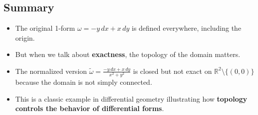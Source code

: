 \documentclass{article}
\begin{document}
	\subsection*{Summary}
	
	\begin{itemize}
		\item The original 1-form \( \omega = -y\,dx + x\,dy \) is defined everywhere, including the origin.
		\item But when we talk about \textbf{exactness}, the topology of the domain matters.
		\item The normalized version \( \tilde{\omega} = \frac{-y\,dx + x\,dy}{x^2 + y^2} \) is closed but not exact on \( \mathbb{R}^2 \setminus \{(0,0)\} \) because the domain is not simply connected.
		\item This is a classic example in differential geometry illustrating how \textbf{topology controls the behavior of differential forms}.
	\end{itemize}
	
\end{document}
